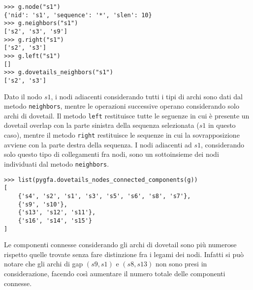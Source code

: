 \captionsetup{justification=centering, singlelinecheck=false}
\begin{minipage}{\linewidth}
\begin{lstlisting}[basicstyle=\ttfamily\scriptsize, frame=topline]
>>> g.node("s1")
{'nid': 's1', 'sequence': '*', 'slen': 10}
>>> g.neighbors("s1")
['s2', 's3', 's9']
>>> g.right("s1")
['s2', 's3']
>>> g.left("s1")
[]
>>> g.dovetails_neighbors("s1")
['s2', 's3']
\end{lstlisting}
\end{minipage}
\captionsetup{justification=justified, singlelinecheck=false}
Dato il nodo $s1$, i nodi adiacenti considerando tutti i tipi di archi sono
dati dal metodo \texttt{neighbors}, mentre le operazioni successive
operano considerando solo archi di dovetail. Il metodo \texttt{left} restituisce
tutte le seguenze in cui è presente un dovetail overlap con la parte
sinistra della sequenza selezionata ($s1$ in questo caso), mentre il metodo
\texttt{right} restituisce le sequenze in cui la sovrapposizione avviene con
la parte destra della sequenza. I nodi adiacenti ad $s1$, considerando solo
questo tipo di collegamenti fra nodi, sono un sottoinsieme dei nodi individuati
dal metodo \texttt{neighbors}.


\captionsetup{justification=centering, singlelinecheck=false}
\begin{minipage}{\linewidth}
\begin{lstlisting}[basicstyle=\ttfamily\scriptsize, frame=topline]
>>> list(pygfa.dovetails_nodes_connected_components(g))
[
	{'s4', 's2', 's1', 's3', 's5', 's6', 's8', 's7'},
	{'s9', 's10'},
	{'s13', 's12', 's11'},
	{'s16', 's14', 's15'}
]
\end{lstlisting}
\end{minipage}
\captionsetup{justification=justified, singlelinecheck=false}
Le componenti connesse considerando gli archi di
dovetail sono più numerose rispetto quelle trovate
senza fare distinzione fra i legami dei nodi. Infatti si può
notare che gli archi di gap $(s9, s1)$ e $(s8, s13)$ non sono
presi in considerazione, facendo così aumentare il numero
totale delle componenti connesse. 


